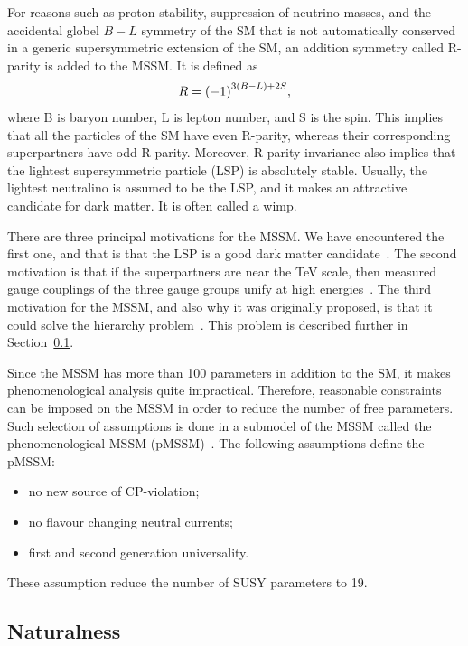 For reasons such as proton stability, suppression of neutrino masses, and the accidental globel $B-L$ symmetry of the SM that is not automatically conserved in a generic supersymmetric extension of the SM, an addition symmetry called R-parity is added to the MSSM. It is defined as
\begin{equation}
R=\qty(-1)^{3(B-L)+2S},
\end{equation}
where B is baryon number, L is lepton number, and S is the spin. This implies that all the particles of the SM have even R-parity, whereas their corresponding superpartners have odd R-parity. Moreover,
R-parity invariance also implies that the lightest supersymmetric particle (LSP) is absolutely stable. Usually, the lightest neutralino is assumed to be the LSP, and it makes an attractive candidate for dark matter. It is often called a \gls{wimp}.

There are three principal motivations for the MSSM. We have encountered the first one, and that is that the LSP is a good dark matter candidate~\cite{Garrett_2011}. The second motivation is that if the superpartners are near the TeV scale, then measured gauge couplings of the three gauge groups unify at high energies~\cite{PhysRevD.24.1681}. The third motivation for the MSSM, and also why it was originally proposed, is that it could solve the hierarchy problem~\cite{DIMOPOULOS1981150}. This problem is described further in Section~\ref{sec:naturalness}.

Since the MSSM has more than 100 parameters in addition to the SM, it makes phenomenological analysis quite impractical. Therefore, reasonable constraints can be imposed on the MSSM in order to reduce the number of free parameters. Such selection of assumptions is done in a submodel of the MSSM called the phenomenological MSSM (pMSSM)~\cite{djouadi1999minimal,Berger_2009}. The following assumptions define the pMSSM:
\begin{itemize}
\item no new source of CP-violation;
\item no flavour changing neutral currents;
\item first and second generation universality.
\end{itemize}
These assumption reduce the number of SUSY parameters to 19.


\subsection{Naturalness}
\label{sec:naturalness}

